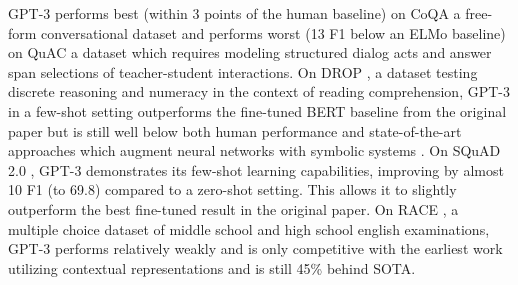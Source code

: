 \documentclass{article}
\begin{document}
GPT-3 performs best (within 3 points of the human baseline) on CoQA \cite{reddy2019coqa} a free-form conversational dataset and performs worst (13 F1 below an ELMo baseline) on QuAC \cite{choi2018quac} a dataset which requires modeling structured dialog acts and answer span selections of teacher-student interactions. On DROP \cite{dua2019drop}, a dataset testing discrete reasoning and numeracy in the context of reading comprehension, GPT-3 in a few-shot setting outperforms the fine-tuned BERT baseline from the original paper but is still well below both human performance and state-of-the-art approaches which augment neural networks with symbolic systems \cite{ran2019numnet}. On SQuAD 2.0 \cite{rajpurkar2018know}, GPT-3 demonstrates its few-shot learning capabilities, improving by almost 10 F1 (to 69.8) compared to a zero-shot setting. This allows it to slightly outperform the best fine-tuned result in the original paper. On RACE \cite{lai2017race}, a multiple choice dataset of middle school and high school english examinations, GPT-3 performs relatively weakly and is only competitive with the earliest work utilizing contextual representations and is still 45\% behind SOTA.
 
\end{document}
